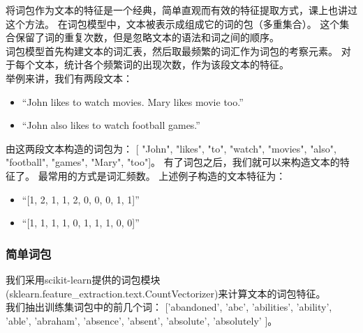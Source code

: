 将词包作为文本的特征是一个经典，简单直观而有效的特征提取方式，课上也讲过这个方法。
在词包模型中，文本被表示成组成它的词的包（多重集合）。
这个集合保留了词的重复次数，但是忽略文本的语法和词之间的顺序。\\
词包模型首先构建文本的词汇表，然后取最频繁的词汇作为词包的考察元素。
对于每个文本，统计各个频繁词的出现次数，作为该段文本的特征。\\
举例来讲，我们有两段文本：
\begin{itemize}
	\item
	  ``John likes to watch movies. Mary likes movie too.''
	\item
	  ``John also likes to watch football games.''
\end{itemize}
由这两段文本构造的词包为：
[ "John", "likes", "to", "watch", "movies", "also", "football", "games", "Mary", "too"]。
有了词包之后，我们就可以来构造文本的特征了。
最常用的方式是词汇频数。
上述例子构造的文本特征为：
\begin{itemize}
	\item
	  ``[1, 2, 1, 1, 2, 0, 0, 0, 1, 1]''
	\item
	  ``[1, 1, 1, 1, 0, 1, 1, 1, 0, 0]''
\end{itemize}

\subsubsection{简单词包}
我们采用scikit-learn提供的词包模块(sklearn.feature\_extraction.text.CountVectorizer)来计算文本的词包特征。\\
我们抽出训练集词包中的前几个词： ['abandoned',
'abc',
'abilities',
'ability',
'able',
'abraham',
'absence',
'absent',
'absolute',
'absolutely'
]。\\

